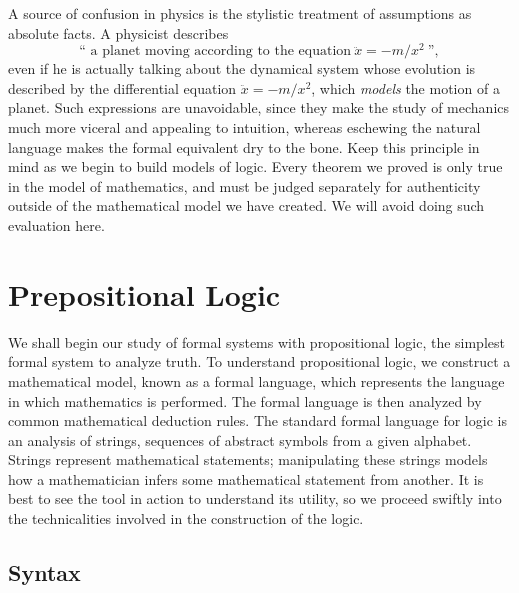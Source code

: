 A source of confusion in physics is the stylistic treatment of assumptions as absolute facts. A physicist describes
%
\[ \text{``\ a planet moving according to the equation}\ \ddot{x} = - m / x^2\ \text{''}, \]
%
even if he is actually talking about the dynamical system whose evolution is described by the differential equation $\ddot{x} = -m/x^2$, which {\it models} the motion of a planet. Such expressions are unavoidable, since they make the study of mechanics much more viceral and appealing to intuition, whereas eschewing the natural language makes the formal equivalent dry to the bone. Keep this principle in mind as we begin to build models of logic. Every theorem we proved is only true in the model of mathematics, and must be judged separately for authenticity outside of the mathematical model we have created. We will avoid doing such evaluation here.






\chapter{Prepositional Logic}

We shall begin our study of formal systems with propositional logic, the simplest formal system to analyze truth. To understand propositional logic, we construct a mathematical model, known as a formal language, which represents the language in which mathematics is performed. The formal language is then analyzed by common mathematical deduction rules. The standard formal language for logic is an analysis of strings, sequences of abstract symbols from a given alphabet. Strings represent mathematical statements; manipulating these strings models how a mathematician infers some mathematical statement from another. It is best to see the tool in action to understand its utility, so we proceed swiftly into the technicalities involved in the construction of the logic.

\section{Syntax}

